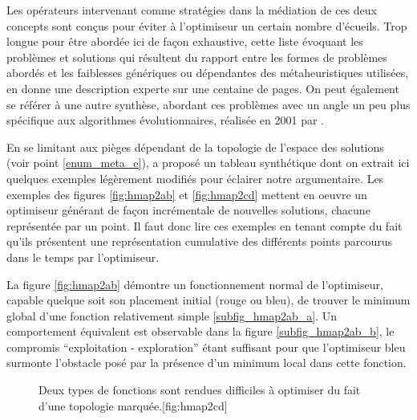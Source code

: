 Les opérateurs intervenant comme stratégies dans la médiation de ces deux concepts sont conçus pour éviter à l'optimiseur un certain nombre d'écueils. Trop longue pour être abordée ici de façon exhaustive, cette liste évoquant les problèmes et solutions qui résultent du rapport entre les formes de problèmes abordés et les faiblesses génériques ou dépendantes des métaheuristiques utilisées, \textcite{Weise2011} en donne une description experte sur une centaine de pages. On peut également se référer à une autre synthèse, abordant ces problèmes avec un angle un peu plus spécifique aux algorithmes évolutionnaires, réalisée en 2001 par \textcite[316-445]{Deb2001}.

En se limitant aux pièges dépendant de la topologie de l'espace des solutions (voir point \ref{enum_meta_e}), \textcite[140]{Weise2011} a proposé un tableau synthétique dont on extrait ici quelques exemples légèrement modifiés pour éclairer notre argumentaire. Les exemples des figures \ref{fig:hmap2ab} et \ref{fig:hmap2cd} mettent en oeuvre un optimiseur générant de façon incrémentale de nouvelles solutions, chacune représentée par un point. Il faut donc lire ces exemples en tenant compte du fait qu'ils présentent une représentation cumulative des différents points parcourus dans le temps par l'optimiseur.

La figure \ref{fig:hmap2ab} démontre un fonctionnement normal de l'optimiseur, capable quelque soit son placement initial (rouge ou bleu), de trouver le minimum global d'une fonction relativement simple \ref{subfig_hmap2ab_a}. Un comportement équivalent est observable dans la figure \ref{subfig_hmap2ab_b}, le compromis \enquote{exploitation - exploration} étant suffisant pour que l'optimiseur bleu surmonte l'obstacle posé par la présence d'un minimum local dans cette fonction.

\begin{figure}[!htbp]
  \begin{sidecaption}{Deux types de fonctions sont rendues difficiles à optimiser du fait d'une topologie marquée.}[fig:hmap2cd]
  \centering
  \qquad
 \end{sidecaption}
\end{figure}

